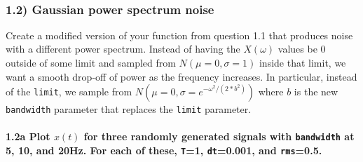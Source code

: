 \documentclass{article}
\begin{document}
    \begin{center}
    \end{center}
    { \hspace*{\fill} \\}
    
    \subsubsection{1.2) Gaussian power spectrum
noise}\label{gaussian-power-spectrum-noise}

Create a modified version of your function from question 1.1 that
produces noise with a different power spectrum. Instead of having the
\(X(\omega)\) values be 0 outside of some limit and sampled from
\(N(\mu=0,\sigma=1)\) inside that limit, we want a smooth drop-off of
power as the frequency increases. In particular, instead of the
\texttt{limit}, we sample from
\(N(\mu=0,\sigma=e^{-{\omega^2/(2*b^2)}})\) where \(b\) is the new
\texttt{bandwidth} parameter that replaces the \texttt{limit} parameter.

    \paragraph{\texorpdfstring{1.2a Plot \(x(t)\) for three randomly
generated signals with \texttt{bandwidth} at 5, 10, and 20Hz. For each
of these, \texttt{T}=1, \texttt{dt}=0.001, and
\texttt{rms}=0.5.}{1.2a Plot x(t) for three randomly generated signals with bandwidth at 5, 10, and 20Hz. For each of these, T=1, dt=0.001, and rms=0.5.}}\label{a-plot-xt-for-three-randomly-generated-signals-with-bandwidth-at-5-10-and-20hz.-for-each-of-these-t1-dt0.001-and-rms0.5.}
\end{document}
